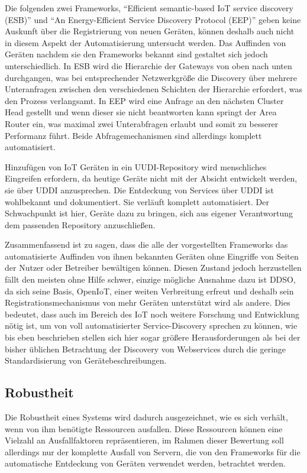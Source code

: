 \documentclass[conference,compsoc]{IEEEtran}
\begin{document}
Die folgenden zwei Frameworks, \enquote{Efficient semantic-based IoT service discovery (ESB)} und \enquote{An Energy-Efficient Service Discovery Protocol (EEP)} geben keine Auskunft über die Registrierung von neuen Geräten, können deshalb auch nicht in diesem Aspekt der Automatisierung untersucht werden. Das Auffinden von Geräten nachdem sie den Frameworks bekannt sind gestaltet sich jedoch unterschiedlich. In ESB wird die Hierarchie der Gateways von oben nach unten durchgangen, was bei entsprechender Netzwerkgröße die Discovery über mehrere Unteranfragen zwischen den verschiedenen Schichten der Hierarchie erfordert, was den Prozess verlangsamt. In EEP wird eine Anfrage an den nächsten Cluster Head gestellt und wenn dieser sie nicht beantworten kann springt der Area Router ein, was maximal zwei Unterabfragen erlaubt und somit zu besserer Performanz führt. Beide Abfragemechanismen sind allerdings komplett automatisiert.

Hinzufügen von IoT Geräten in ein UUDI-Repository wird menschliches Eingreifen erfordern, da heutige Geräte nicht mit der Absicht entwickelt werden, sie über UDDI anzusprechen. Die Entdeckung von Services über UDDI ist wohlbekannt und dokumentiert. Sie verläuft komplett automatisiert. Der Schwachpunkt ist hier, Geräte dazu zu bringen, sich aus eigener Verantwortung dem passenden Repository anzuschließen.

Zusammenfassend ist zu sagen, dass die alle der vorgestellten Frameworks das automatisierte Auffinden von ihnen bekannten Geräten ohne Eingriffe von Seiten der Nutzer oder Betreiber bewältigen können. Diesen Zustand jedoch herzustellen fällt den meisten ohne Hilfe schwer, einzige mögliche Ausnahme dazu ist DDSO, da sich seine Basis, OpenIoT, einer weiten Verbreitung erfreut und deshalb sein Registrationsmechanismus von mehr Geräten unterstützt wird als andere. Dies bedeutet, dass auch im Bereich des IoT noch weitere Forschung und Entwicklung nötig ist, um von voll automatisierter Service-Discovery sprechen zu können, wie bis eben beschrieben stellen sich hier sogar größere Herausforderungen als bei der bisher üblichen Betrachtung der Discovery von Webservices durch die geringe Standardisierung von Gerätebeschreibungen.

\subsection{Robustheit}

Die Robustheit eines Systems wird dadurch ausgezeichnet, wie es sich verhält, wenn von ihm benötigte Ressourcen ausfallen. Diese Ressourcen können eine Vielzahl an Ausfallfaktoren repräsentieren, im Rahmen dieser Bewertung soll allerdings nur der komplette Ausfall von Servern, die von den Frameworks für die automatische Entdeckung von Geräten verwendet werden, betrachtet werden.
\end{document}
